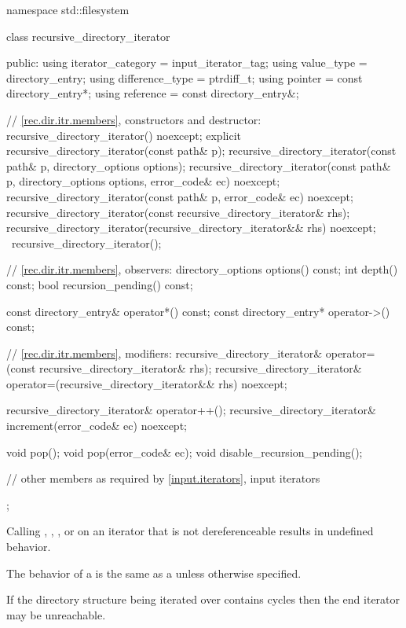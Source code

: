 \begin{codeblock}
namespace std::filesystem {
  class recursive_directory_iterator {
  public:
    using iterator_category = input_iterator_tag;
    using value_type        = directory_entry;
    using difference_type   = ptrdiff_t;
    using pointer           = const directory_entry*;
    using reference         = const directory_entry&;

    // \ref{rec.dir.itr.members}, constructors and destructor:
    recursive_directory_iterator() noexcept;
    explicit recursive_directory_iterator(const path& p);
    recursive_directory_iterator(const path& p, directory_options options);
    recursive_directory_iterator(const path& p, directory_options options,
                                 error_code& ec) noexcept;
    recursive_directory_iterator(const path& p, error_code& ec) noexcept;
    recursive_directory_iterator(const recursive_directory_iterator& rhs);
    recursive_directory_iterator(recursive_directory_iterator&& rhs) noexcept;
   ~recursive_directory_iterator();

    // \ref{rec.dir.itr.members}, observers:
    directory_options  options() const;
    int                depth() const;
    bool               recursion_pending() const;

    const directory_entry& operator*() const;
    const directory_entry* operator->() const;

    // \ref{rec.dir.itr.members}, modifiers:
    recursive_directory_iterator&
      operator=(const recursive_directory_iterator& rhs);
    recursive_directory_iterator&
      operator=(recursive_directory_iterator&& rhs) noexcept;

    recursive_directory_iterator& operator++();
    recursive_directory_iterator& increment(error_code& ec) noexcept;

    void pop();
    void pop(error_code& ec);
    void disable_recursion_pending();

    // other members as required by \ref{input.iterators}, input iterators
  };
}
\end{codeblock}

\pnum
Calling , , ,
 or 
on an iterator that is not dereferenceable results in undefined behavior.

\pnum
The behavior of a  is the same
as a  unless otherwise specified.

\pnum
\begin{note} If the directory structure being iterated over contains cycles
then the end iterator may be unreachable. \end{note}

